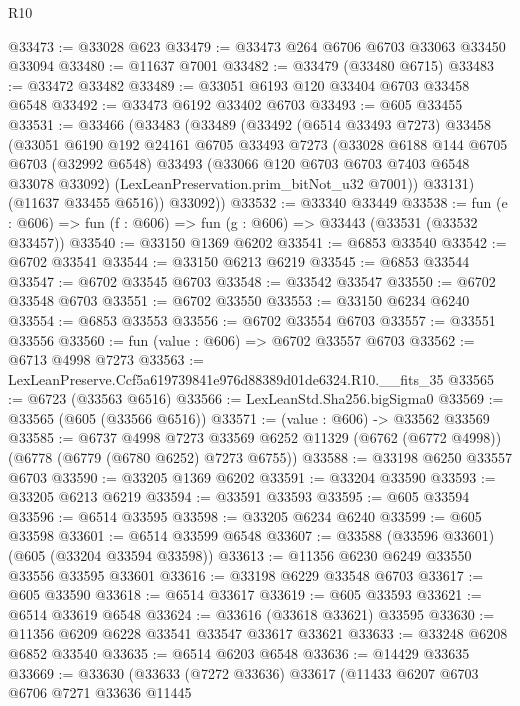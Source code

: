 \begin{lexlean}{R10}
\begin{coremodule}
@33473 := @33028 @623
@33479 := @33473 @264 @6706 @6703 @33063 @33450 @33094
@33480 := @11637 @7001
@33482 := @33479 (@33480 @6715)
@33483 := @33472 @33482
@33489 := @33051 @6193 @120 @33404 @6703 @33458 @6548
@33492 := @33473 @6192 @33402 @6703
@33493 := @605 @33455
@33531 := @33466
    (@33483
      (@33489
        (@33492
          (@6514 @33493 @7273)
          @33458
          (@33051
            @6190
            @192
            @24161
            @6705
            @33493
            @7273
            (@33028
              @6188
              @144
              @6705
              @6703
              (@32992 @6548)
              @33493
              (@33066 @120 @6703 @6703 @7403 @6548 @33078 @33092)
              (LexLeanPreservation.prim_bitNot_u32 @7001))
            @33131)
          (@11637 @33455 @6516))
        @33092))
@33532 := @33340 @33449
@33538 := fun (e : @606) => fun (f : @606) => fun (g : @606) => @33443 (@33531 (@33532 @33457))
@33540 := @33150 @1369 @6202
@33541 := @6853 @33540
@33542 := @6702 @33541
@33544 := @33150 @6213 @6219
@33545 := @6853 @33544
@33547 := @6702 @33545 @6703
@33548 := @33542 @33547
@33550 := @6702 @33548 @6703
@33551 := @6702 @33550
@33553 := @33150 @6234 @6240
@33554 := @6853 @33553
@33556 := @6702 @33554 @6703
@33557 := @33551 @33556
@33560 := fun (value : @606) => @6702 @33557 @6703
@33562 := @6713 @4998 @7273
@33563 := LexLeanPreserve.Ccf5a619739841e976d88389d01de6324.R10.__fits_35
@33565 := @6723 (@33563 @6516)
@33566 := LexLeanStd.Sha256.bigSigma0
@33569 := @33565 (@605 (@33566 @6516))
@33571 := (value : @606) -> @33562 @33569
@33585 := @6737
    @4998
    @7273
    @33569
    @6252
    @11329
    (@6762 (@6772 @4998))
    (@6778 (@6779 (@6780 @6252) @7273 @6755))
@33588 := @33198 @6250 @33557 @6703
@33590 := @33205 @1369 @6202
@33591 := @33204 @33590
@33593 := @33205 @6213 @6219
@33594 := @33591 @33593
@33595 := @605 @33594
@33596 := @6514 @33595
@33598 := @33205 @6234 @6240
@33599 := @605 @33598
@33601 := @6514 @33599 @6548
@33607 := @33588 (@33596 @33601) (@605 (@33204 @33594 @33598))
@33613 := @11356 @6230 @6249 @33550 @33556 @33595 @33601
@33616 := @33198 @6229 @33548 @6703
@33617 := @605 @33590
@33618 := @6514 @33617
@33619 := @605 @33593
@33621 := @6514 @33619 @6548
@33624 := @33616 (@33618 @33621) @33595
@33630 := @11356 @6209 @6228 @33541 @33547 @33617 @33621
@33633 := @33248 @6208 @6852 @33540
@33635 := @6514 @6203 @6548
@33636 := @14429 @33635
@33669 := @33630
    (@33633
      (@7272 @33636)
      @33617
      (@11433
        @6207
        @6703
        @6706
        @7271
        @33636
        @11445

\end{coremodule}
\end{lexlean}
